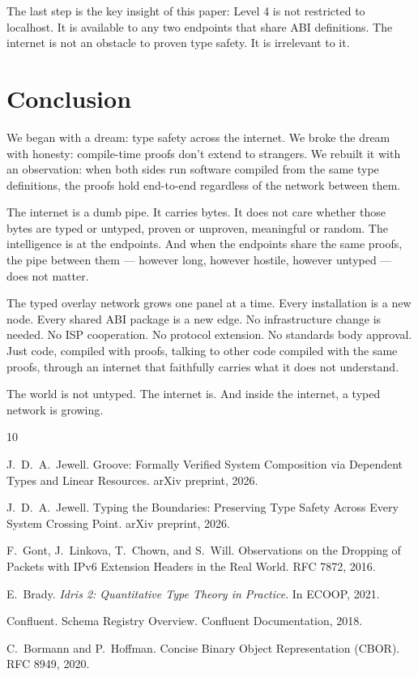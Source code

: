 \documentclass[11pt,a4paper]{article}
\begin{document}
The last step is the key insight of this paper: Level 4 is not restricted
to localhost. It is available to any two endpoints that share ABI
definitions. The internet is not an obstacle to proven type safety. It is
irrelevant to it.

\section{Conclusion}

We began with a dream: type safety across the internet. We broke the
dream with honesty: compile-time proofs don't extend to strangers. We
rebuilt it with an observation: when both sides run software compiled
from the same type definitions, the proofs hold end-to-end regardless
of the network between them.

The internet is a dumb pipe. It carries bytes. It does not care whether
those bytes are typed or untyped, proven or unproven, meaningful or
random. The intelligence is at the endpoints. And when the endpoints
share the same proofs, the pipe between them --- however long, however
hostile, however untyped --- does not matter.

The typed overlay network grows one panel at a time. Every installation
is a new node. Every shared ABI package is a new edge. No infrastructure
change is needed. No ISP cooperation. No protocol extension. No
standards body approval. Just code, compiled with proofs, talking to
other code compiled with the same proofs, through an internet that
faithfully carries what it does not understand.

The world is not untyped. The internet is. And inside the internet, a
typed network is growing.


\begin{thebibliography}{10}

J.~D.~A.~Jewell.
\newblock Groove: Formally Verified System Composition via Dependent Types and
  Linear Resources.
\newblock arXiv preprint, 2026.

J.~D.~A.~Jewell.
\newblock Typing the Boundaries: Preserving Type Safety Across Every System
  Crossing Point.
\newblock arXiv preprint, 2026.

F.~Gont, J.~Linkova, T.~Chown, and S.~Will.
\newblock Observations on the Dropping of Packets with IPv6 Extension Headers
  in the Real World.
\newblock RFC 7872, 2016.

E.~Brady.
\newblock \emph{Idris 2: Quantitative Type Theory in Practice}.
\newblock In ECOOP, 2021.

Confluent.
\newblock Schema Registry Overview.
\newblock Confluent Documentation, 2018.

C.~Bormann and P.~Hoffman.
\newblock Concise Binary Object Representation (CBOR).
\newblock RFC 8949, 2020.

\end{thebibliography}
\end{document}
